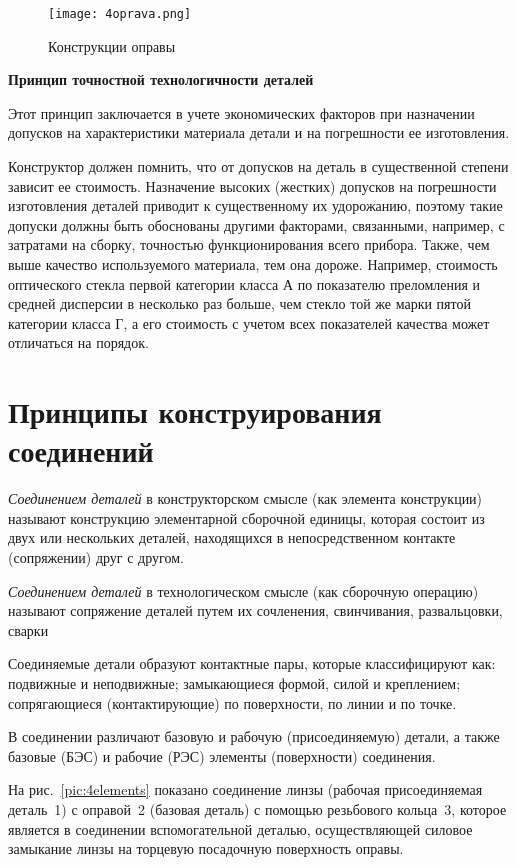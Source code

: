 \begin{figure}[H]
	\caption{Конструкции оправы}
	\texttt{[image: 4oprava.png]}
	\label{pic:4oprava}
\end{figure}

\begin{flushleft}
\textbf{Принцип точностной технологичности деталей}
\end{flushleft}

Этот принцип заключается в учете экономических факторов при назначении допусков на характеристики материала детали и на погрешности ее изготовления.

Конструктор должен помнить, что от допусков на деталь в существенной степени зависит ее стоимость. Назначение высоких (жестких) допусков на погрешности изготовления деталей приводит к существенному их удорожанию, поэтому такие допуски должны быть обоснованы другими факторами, связанными, например, с затратами на сборку, точностью функционирования всего прибора. Также,  чем выше качество используемого материала, тем она дороже. Например, стоимость оптического стекла первой категории класса А по показателю преломления и средней дисперсии в несколько раз больше, чем стекло той же марки пятой категории класса Г, а его стоимость с учетом всех показателей качества может отличаться на порядок.

\section{Принципы конструирования соединений}

\textit{Соединением деталей} в конструкторском смысле (как элемента конструкции) называют конструкцию элементарной сборочной единицы, которая состоит из двух или нескольких деталей, находящихся в непосредственном контакте (сопряжении) друг с другом. 

\textit{Соединением деталей} в технологическом смысле (как сборочную операцию) называют сопряжение деталей путем их сочленения, свинчивания, развальцовки, сварки

Соединяемые детали образуют контактные пары, которые классифицируют как: подвижные и неподвижные; замыкающиеся формой, силой и креплением; сопрягающиеся (контактирующие) по поверхности, по линии и по точке.

В соединении различают базовую и рабочую (присоединяемую) детали, а также базовые (БЭС) и рабочие (РЭС) элементы (поверхности) соединения.

На рис.~\ref{pic:4elements} показано соединение линзы (рабочая присоединяемая деталь~1) с оправой~2 (базовая деталь) с помощью резьбового кольца~3, которое является в соединении вспомогательной деталью, осуществляющей силовое замыкание линзы на торцевую посадочную поверхность оправы.

